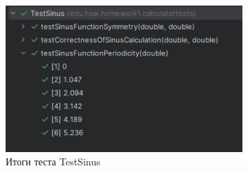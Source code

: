\documentclass[areasetadvanced]{scrartcl}
\begin{document}
\begin{figure}[H]
	\centering
	\includegraphics[width=0.8\textwidth]{images/testSinus.png}
	\caption{Итоги теста TestSinus}
	\label{fig:syntdiag}
\end{figure}
\end{document}
